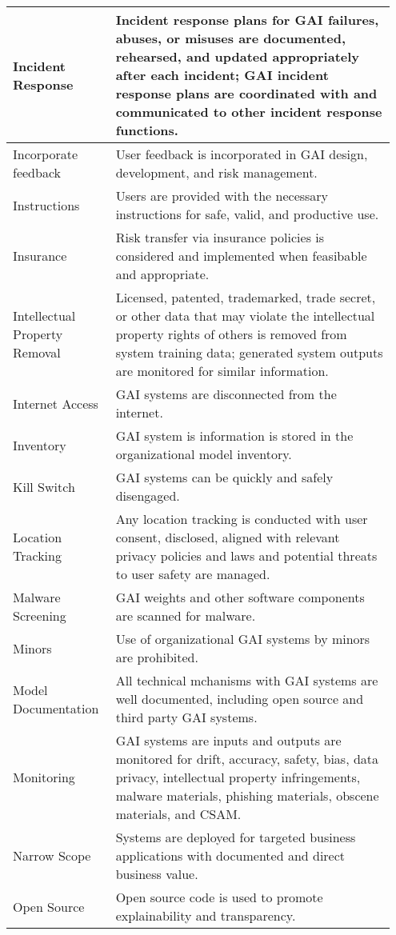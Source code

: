 \documentclass[fleqn]{article}
\begin{document}
\begin{table}[H]
\begin{tabular}{|m{0.25\linewidth} |m{0.70\linewidth} |}
		Incident Response & Incident response plans for GAI failures, abuses, or misuses are documented, rehearsed, and updated appropriately after each incident; GAI incident response plans are coordinated with and communicated to other incident response functions.  \\ \hline
		Incorporate feedback  & User feedback is incorporated in GAI design, development, and risk management.  \\ \hline
		Instructions & Users are provided with the necessary instructions for safe, valid, and productive use. \\ \hline
		Insurance & Risk transfer via insurance policies is considered and implemented when feasibable and appropriate.  \\ \hline
		Intellectual Property Removal & Licensed, patented, trademarked, trade secret, or other data that may violate the intellectual property rights of others is removed from system training data; generated system outputs are monitored for similar information.  \\ \hline
		Internet Access & GAI systems are disconnected from the internet.  \\ \hline
		Inventory & GAI system is information is stored in the organizational model inventory.  \\ \hline
		Kill Switch & GAI systems can be quickly and safely disengaged.  \\ \hline
		Location Tracking & Any location tracking is conducted with user consent, disclosed, aligned with relevant privacy policies and laws and potential threats to user safety are managed.   \\ \hline
		Malware Screening & GAI weights and other software components are scanned for malware.  \\ \hline
		Minors & Use of organizational GAI systems by minors are prohibited.  \\ \hline
		Model Documentation  & All technical mchanisms with GAI systems are well documented, including open source and third party GAI systems.  \\ \hline
		Monitoring & GAI systems are inputs and outputs are monitored for drift, accuracy, safety, bias, data privacy, intellectual property infringements, malware materials, phishing materials, obscene materials, and CSAM.  \\ \hline
		Narrow Scope & Systems are deployed for targeted business applications with documented and direct business value. \\ \hline
		Open Source & Open source code is used to promote explainability and transparency.  \\ \hline

\end{tabular}
\end{table}
\end{document}
